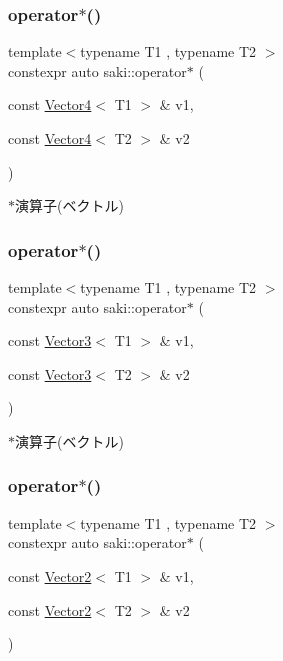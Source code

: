 \subsubsection{\texorpdfstring{operator$\ast$()}{operator*()}\hspace{0.1cm}{\footnotesize\ttfamily [9/14]}}
{\footnotesize\ttfamily template$<$typename T1 , typename T2 $>$ \\
constexpr auto saki\+::operator$\ast$ (\begin{DoxyParamCaption}\item[{const \mbox{\hyperlink{classsaki_1_1_vector4}{Vector4}}$<$ T1 $>$ \&}]{v1,  }\item[{const \mbox{\hyperlink{classsaki_1_1_vector4}{Vector4}}$<$ T2 $>$ \&}]{v2 }\end{DoxyParamCaption})}



$\ast$演算子(ベクトル) 

\mbox{\label{namespacesaki_a44134827291df1234e04cbd1837a05ac}} 
\subsubsection{\texorpdfstring{operator$\ast$()}{operator*()}\hspace{0.1cm}{\footnotesize\ttfamily [10/14]}}
{\footnotesize\ttfamily template$<$typename T1 , typename T2 $>$ \\
constexpr auto saki\+::operator$\ast$ (\begin{DoxyParamCaption}\item[{const \mbox{\hyperlink{classsaki_1_1_vector3}{Vector3}}$<$ T1 $>$ \&}]{v1,  }\item[{const \mbox{\hyperlink{classsaki_1_1_vector3}{Vector3}}$<$ T2 $>$ \&}]{v2 }\end{DoxyParamCaption})}



$\ast$演算子(ベクトル) 

\mbox{\label{namespacesaki_aa99ace9b4d1710c38d180a75514e748f}} 
\subsubsection{\texorpdfstring{operator$\ast$()}{operator*()}\hspace{0.1cm}{\footnotesize\ttfamily [11/14]}}
{\footnotesize\ttfamily template$<$typename T1 , typename T2 $>$ \\
constexpr auto saki\+::operator$\ast$ (\begin{DoxyParamCaption}\item[{const \mbox{\hyperlink{classsaki_1_1_vector2}{Vector2}}$<$ T1 $>$ \&}]{v1,  }\item[{const \mbox{\hyperlink{classsaki_1_1_vector2}{Vector2}}$<$ T2 $>$ \&}]{v2 }\end{DoxyParamCaption})}



